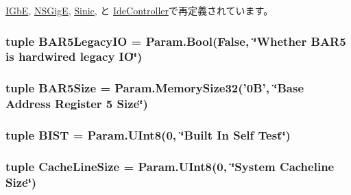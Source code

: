 \hyperlink{classEthernet_1_1IGbE_af86e51daee4f9d86104270e5ed9a0890}{IGbE}, \hyperlink{classEthernet_1_1NSGigE_af86e51daee4f9d86104270e5ed9a0890}{NSGigE}, \hyperlink{classEthernet_1_1Sinic_af86e51daee4f9d86104270e5ed9a0890}{Sinic}, と \hyperlink{classIde_1_1IdeController_af86e51daee4f9d86104270e5ed9a0890}{IdeController}で再定義されています。\hypertarget{classPci_1_1PciDevice_a1b1ce5b4104691adbdac48022f8c3a85}{
\subsubsection[{BAR5LegacyIO}]{\setlength{\rightskip}{0pt plus 5cm}tuple {\bf BAR5LegacyIO} = Param.Bool(False, \char`\"{}Whether {\bf BAR5} is hardwired legacy IO\char`\"{})}}
\label{classPci_1_1PciDevice_a1b1ce5b4104691adbdac48022f8c3a85}
\hypertarget{classPci_1_1PciDevice_ac4c34d8860543ffbe7a01a270d2b78b5}{
\subsubsection[{BAR5Size}]{\setlength{\rightskip}{0pt plus 5cm}tuple {\bf BAR5Size} = Param.MemorySize32('0B', \char`\"{}Base Address Register 5 Size\char`\"{})}}
\label{classPci_1_1PciDevice_ac4c34d8860543ffbe7a01a270d2b78b5}
\hypertarget{classPci_1_1PciDevice_a3c577c0e81803b98a8618c482483eeb2}{
\subsubsection[{BIST}]{\setlength{\rightskip}{0pt plus 5cm}tuple {\bf BIST} = Param.UInt8(0, \char`\"{}Built In Self Test\char`\"{})}}
\label{classPci_1_1PciDevice_a3c577c0e81803b98a8618c482483eeb2}
\hypertarget{classPci_1_1PciDevice_a5aa1725bb5acbc487d1870539a3d6104}{
\subsubsection[{CacheLineSize}]{\setlength{\rightskip}{0pt plus 5cm}tuple {\bf CacheLineSize} = Param.UInt8(0, \char`\"{}System Cacheline Size\char`\"{})}}
